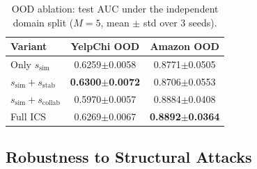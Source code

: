 \documentclass[11pt]{article}
\begin{document}
\begin{table}[t]
\centering
\caption{OOD ablation: test AUC under the independent domain split ($M{=}5$, mean $\pm$ std over 3 seeds).}
\label{tab:ablation_ood}
\begin{tabular}{lcc}
\toprule
Variant & YelpChi OOD & Amazon OOD \\
\midrule
Only $s_{\text{sim}}$ & 0.6259$\pm$0.0058 & 0.8771$\pm$0.0505 \\
$s_{\text{sim}} + s_{\text{stab}}$ & \textbf{0.6300$\pm$0.0072} & 0.8706$\pm$0.0553 \\
$s_{\text{sim}} + s_{\text{collab}}$ & 0.5970$\pm$0.0057 & 0.8884$\pm$0.0408 \\
Full ICS & 0.6269$\pm$0.0067 & \textbf{0.8892$\pm$0.0364} \\
\bottomrule
\end{tabular}
\end{table}

\subsection{Robustness to Structural Attacks}\label{sec:attack}
\end{document}
